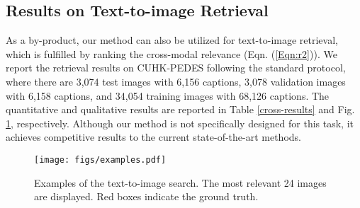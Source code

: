 \documentclass[runningheads]{llncs}
\begin{document}
 
\subsection{Results on Text-to-image Retrieval}

As a by-product, our method can also be utilized for text-to-image retrieval, which is fulfilled by ranking the cross-modal relevance (Eqn. (\ref{Eqn:r2})). We report the retrieval results on CUHK-PEDES following the standard protocol, where there are 3,074 test images with 6,156 captions, 3,078 validation images with 6,158 captions, and 34,054 training images with 68,126 captions. The quantitative and qualitative results are reported in Table \ref{cross-results} and Fig. \ref{fig:text-to-image-figure}, respectively. Although our method is not specifically designed for this task, it achieves competitive results to the current state-of-the-art methods. 

\begin{figure}[t]
 \begin{center}
\texttt{[image: figs/examples.pdf]}  \vspace{-1em} 
 \caption{Examples of the text-to-image search. The most relevant 24 images are displayed. Red boxes indicate the ground truth.}\label{fig:text-to-image-figure} 
 \end{center}\vspace{-2em}
\end{figure}
\end{document}
